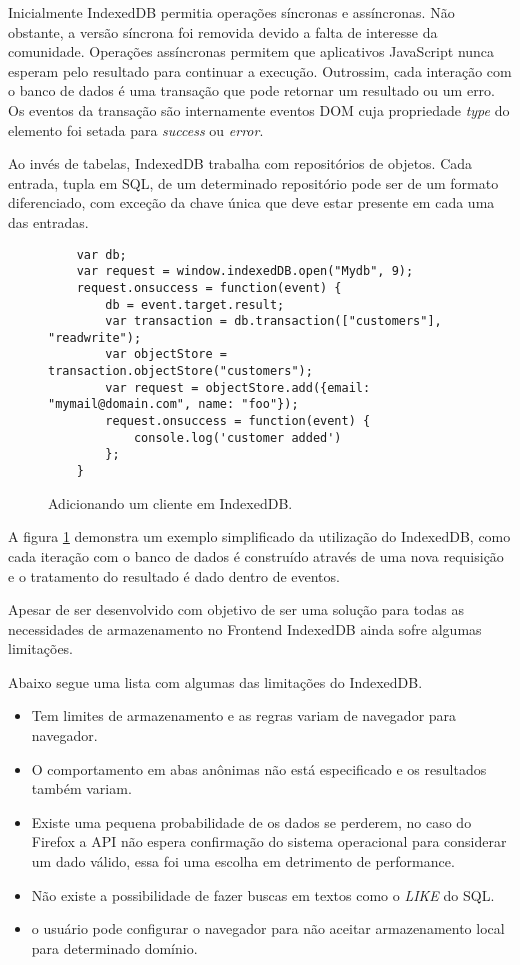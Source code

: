 Inicialmente IndexedDB permitia operações síncronas e assíncronas.
Não obstante, a versão síncrona foi removida devido a falta de
interesse da comunidade. Operações assíncronas permitem que
aplicativos JavaScript nunca esperam pelo resultado para continuar a
execução. Outrossim, cada interação com o banco de dados é uma
transação que pode retornar um resultado ou um erro. Os eventos da
transação são internamente eventos DOM cuja propriedade \textit{type}
do elemento foi setada para \textit{success} ou \textit{error}.

Ao invés de tabelas, IndexedDB trabalha com repositórios de objetos.
Cada entrada, tupla em SQL, de um determinado repositório pode ser de
um formato diferenciado, com exceção da chave única que deve estar
presente em cada uma das entradas.

\begin{figure}[H]
\centering
\begin{verbatim}
	var db;
	var request = window.indexedDB.open("Mydb", 9);
	request.onsuccess = function(event) {
		db = event.target.result;
		var transaction = db.transaction(["customers"], "readwrite");
		var objectStore = transaction.objectStore("customers");
		var request = objectStore.add({email: "mymail@domain.com", name: "foo"});
		request.onsuccess = function(event) {
			console.log('customer added')
		};
	}
\end{verbatim}
\caption{Adicionando um cliente em IndexedDB.}
\label{fig:IndexedDB}
\end{figure}

A figura \ref{fig:IndexedDB} demonstra um exemplo simplificado da
utilização do IndexedDB, como cada iteração com o banco de dados é
construído através de uma nova requisição e o tratamento do resultado
é dado dentro de eventos.

Apesar de ser desenvolvido com objetivo de ser uma solução para todas
as necessidades de armazenamento no Frontend IndexedDB ainda sofre
algumas limitações.

Abaixo segue uma lista com algumas das limitações do IndexedDB.

\begin{itemize}
\item Tem limites de armazenamento e as regras variam de navegador para navegador.
\item O comportamento em abas anônimas não está especificado e os resultados também variam.
\item Existe uma pequena probabilidade de os dados se perderem, no caso do Firefox a API não espera confirmação do sistema operacional para considerar um dado válido, essa foi uma escolha em detrimento de performance.
\item Não existe a possibilidade de fazer buscas em textos como o \textit{LIKE} do SQL.
\item o usuário pode configurar o navegador para não aceitar armazenamento local para determinado domínio.
\end{itemize}

